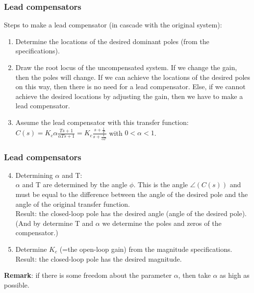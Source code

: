 \begin{frame}
	\frametitle{Lead compensators}
	Steps to make a lead compensator (in cascade with the original system):
	\begin{enumerate}
		\item Determine the locations of the desired dominant poles (from the specifications).
		\item Draw the root locus of the uncompensated system. If we change the gain, then the poles will change. If we can achieve the locations of the desired poles on this way, then there is no need for a lead compensator. Else, if we cannot achieve the desired locations by adjusting the gain, then we have to make a lead compensator. 
		\item Assume the lead compensator with this transfer function: \\
		$C(s)=K_c \alpha\frac{Ts+1}{\alpha Ts+1}= K_c\frac{s+\frac{1}{T}}{s+\frac{1}{\alpha T}}$ with $0<\alpha<1$.
	\end{enumerate}
\end{frame}

\begin{frame}
	\frametitle{Lead compensators}
		\begin{enumerate}
			\setcounter{enumi}{3}
			\item Determining $\alpha$ and T:\\
			$\alpha$ and T are determined by the angle $\phi$. This is the angle $\angle(C(s))$ and must be equal to the difference between the angle of the desired pole and the angle of the original transfer function. \\
			Result: the closed-loop pole has the desired angle (angle of the desired pole). (And by determine T and $\alpha$ we determine the poles and zeros of the compensator.)
			\item Determine $K_c$ (=the open-loop gain) from the magnitude specifications.\\
			Result: the closed-loop pole has the desired magnitude. 
		\end{enumerate}
		\textbf{Remark}: if there is some freedom about the parameter $\alpha$, then take $\alpha$ as high as possible. 
\end{frame}

